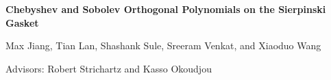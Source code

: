 \documentclass[a0, landscape]{a0poster}
\begin{document}
		
\begin{minipage}[t]{\linewidth}
    \begin{center}
    \linespread{1.5}
    \color{CornellRed} \Huge \textbf{Chebyshev and Sobolev Orthogonal Polynomials on the Sierpinski Gasket}
        
                \color{Black}
                \LARGE  Max Jiang, Tian Lan, Shashank Sule, Sreeram Venkat, and Xiaoduo Wang
                
                
                \LARGE  Advisors: Robert Strichartz and Kasso Okoudjou
                
                
                \end{center}
                \end{minipage}
\end{document}
